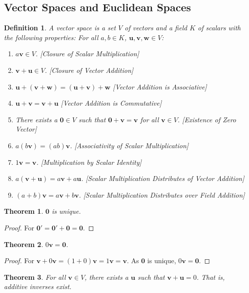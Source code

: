 \documentclass[crop=false,class=book]{standalone}
\theoremstyle{mystyle}
\newtheorem{theorem}{Theorem}[section]
\newtheorem{definition}{Definition}[section]
\begin{document}
\subsection{Vector Spaces and Euclidean Spaces}
\begin{definition}
A vector space is a set $V$ of vectors and a field $K$ of scalars with the following properties: For all $a,b\in K$, $\mathbf{u,v,w}\in V$:
\begin{enumerate}
    \item $a\mathbf{v} \in V$. \hfill [Closure of Scalar Multiplication]
    \item $\mathbf{v}+\mathbf{u} \in V$. \hfill [Closure of Vector Addition]
    \item $\mathbf{u}+(\mathbf{v}+\mathbf{w}) = (\mathbf{u}+\mathbf{v})+\mathbf{w}$ \hfill [Vector Addition is Associative]
    \item $\mathbf{u}+\mathbf{v}=\mathbf{v}+\mathbf{u}$ \hfill [Vector Addition is Commutative]
    \item There exists a $\mathbf{0}\in V$ such that $\mathbf{0}+\mathbf{v}=\mathbf{v}$ for all $\mathbf{v}\in V$. \hfill [Existence of Zero Vector]
    \item $a(b\mathbf{v}) = (ab)\mathbf{v}$. \hfill [Associativity of Scalar Multiplication]
    \item $1 \mathbf{v} = \mathbf{v}$. \hfill[Multiplication by Scalar Identity]
    \item $a(\mathbf{v}+\mathbf{u}) = a\mathbf{v}+a\mathbf{u}$. \hfill [Scalar Multiplication Distributes of Vector Addition]
    \item $(a+b)\mathbf{v}= a\mathbf{v}+b\mathbf{v}$. \hfill [Scalar Multiplication Distributes over Field Addition]
\end{enumerate}
\end{definition}
\begin{theorem}
$\mathbf{0}$ is unique.
\end{theorem}
\begin{proof}
For $\mathbf{0}'=\mathbf{0}'+\mathbf{0}=\mathbf{0}$.
\end{proof}
\begin{theorem}
$0\mathbf{v} = \mathbf{0}$.
\end{theorem}
\begin{proof}
For $\mathbf{v}+0\mathbf{v} = (1+0)\mathbf{v} = 1\mathbf{v} = \mathbf{v}$. As $\mathbf{0}$ is unique, $0\mathbf{v}=\mathbf{0}$.
\end{proof}
\begin{theorem}
For all $\mathbf{v}\in V$, there exists a $\mathbf{u}$ such that $\mathbf{v}+\mathbf{u}=0$. That is, additive inverses exist.
\end{theorem}
\end{document}

